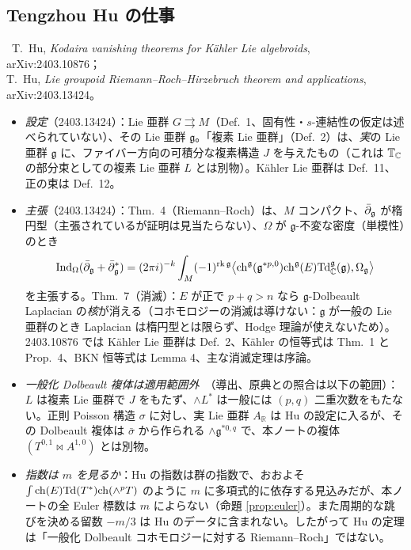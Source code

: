 \subsection{Tengzhou Hu の仕事}
\tC\ T.\ Hu, \emph{Kodaira vanishing theorems for K\"ahler Lie algebroids}, arXiv:2403.10876；\\ T.\ Hu, \emph{Lie groupoid Riemann--Roch--Hirzebruch theorem and applications}, arXiv:2403.13424。
\begin{itemize}
\item \emph{設定}（2403.13424）：Lie 亜群 $G\rightrightarrows M$（Def.\ 1、固有性・$s$-連結性の仮定は述べられていない）、その Lie 亜群 $\mathfrak g$。「複素 Lie 亜群」（Def.\ 2）は、\emph{実}の Lie 亜群 $\mathfrak g$ に、ファイバー方向の可積分な複素構造 $J$ を与えたもの（これは $\mathbb T_\mathbb C$ の部分束としての複素 Lie 亜群 $L$ とは別物）。Kähler Lie 亜群は Def.\ 11、正の束は Def.\ 12。
\item \emph{主張}（2403.13424）：Thm.\ 4（Riemann--Roch）は、$M$ コンパクト、$\bar\partial_{\mathfrak g}$ が楕円型（主張されているが証明は見当たらない）、$\Omega$ が $\mathfrak g$-不変な密度（単模性）のとき
\[\mathrm{Ind}_\Omega(\bar\partial_{\mathfrak g}+\bar\partial_{\mathfrak g}^*)=(2\pi i)^{-k}\int_M(-1)^{\mathrm{rk}\,\mathfrak g}\bigl\langle\mathrm{ch}^{\mathfrak g}(\mathfrak g^{*p,0})\mathrm{ch}^{\mathfrak g}(E)\mathrm{Td}^{\mathfrak g}_\mathbb C(\mathfrak g),\Omega_{\mathfrak g}\bigr\rangle\]
を主張する。Thm.\ 7（消滅）：$E$ が正で $p+q>n$ なら $\mathfrak g$-Dolbeault Laplacian の\emph{核}が消える（コホモロジーの消滅は導けない：$\mathfrak g$ が一般の Lie 亜群のとき Laplacian は楕円型とは限らず、Hodge 理論が使えないため）。2403.10876 では Kähler Lie 亜群は Def.\ 2、Kähler の恒等式は Thm.\ 1 と Prop.\ 4、BKN 恒等式は Lemma 4、主な消滅定理は序論。
\item \emph{一般化 Dolbeault 複体は適用範囲外}\tP\ （導出、原典との照合は以下の範囲）：$L$ は複素 Lie 亜群で $J$ をもたず、$\wedge L^*$ は一般には $(p,q)$ 二重次数をもたない。正則 Poisson 構造 $\sigma$ に対し、実 Lie 亜群 $A_{\mathbb R}$ は Hu の設定に入るが、その Dolbeault 複体は $\bar\sigma$ から作られる $\wedge\mathfrak g^{*0,q}$ で、本ノートの複体 $(T^{0,1}\bowtie A^{1,0})$ とは別物。
\item \emph{指数は $m$ を見るか}\tK：Hu の指数は群の指数で、おおよそ $\int\mathrm{ch}(E)\mathrm{Td}(T^*)\mathrm{ch}(\wedge^pT)$ のように $m$ に多項式的に依存する見込みだが、本ノートの全 Euler 標数は $m$ によらない（命題 \ref{prop:euler}）。また周期的な跳びを決める留数 $-m/3$ は Hu のデータに含まれない。したがって Hu の定理は「一般化 Dolbeault コホモロジーに対する Riemann--Roch」ではない。

\end{itemize}
